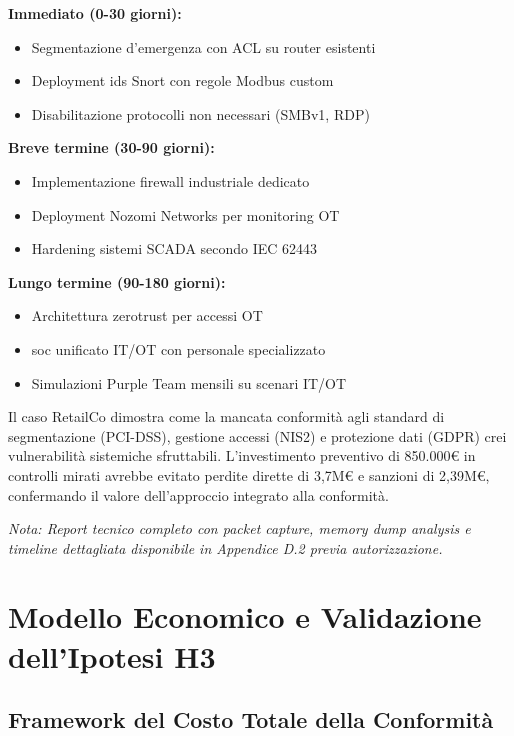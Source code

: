 \textbf{Immediato (0-30 giorni):}
\begin{itemize}
    \item Segmentazione d'emergenza con ACL su router esistenti
    \item Deployment \gls{ids} Snort con regole Modbus custom
    \item Disabilitazione protocolli non necessari (SMBv1, RDP)
\end{itemize}

\textbf{Breve termine (30-90 giorni):}
\begin{itemize}
    \item Implementazione firewall industriale dedicato
    \item Deployment Nozomi Networks per monitoring OT
    \item Hardening sistemi SCADA secondo IEC 62443
\end{itemize}

\textbf{Lungo termine (90-180 giorni):}
\begin{itemize}
    \item Architettura \gls{zerotrust} per accessi OT
    \item \gls{soc} unificato IT/OT con personale specializzato
    \item Simulazioni Purple Team mensili su scenari IT/OT
\end{itemize}

Il caso RetailCo dimostra come la mancata conformità agli standard di segmentazione (PCI-DSS), gestione accessi (NIS2) e protezione dati (GDPR) crei vulnerabilità sistemiche sfruttabili. L'investimento preventivo di 850.000€ in controlli mirati avrebbe evitato perdite dirette di 3,7M€ e sanzioni di 2,39M€, confermando il valore dell'approccio integrato alla conformità.

\textit{Nota: Report tecnico completo con packet capture, memory dump analysis e timeline dettagliata disponibile in Appendice D.2 previa autorizzazione.}

\section{\texorpdfstring{\textbf{Modello Economico e Validazione dell'Ipotesi H3}}{4.6 - Modello Economico e Validazione dell'Ipotesi H3}}

\subsection{Framework del Costo Totale della Conformità}

